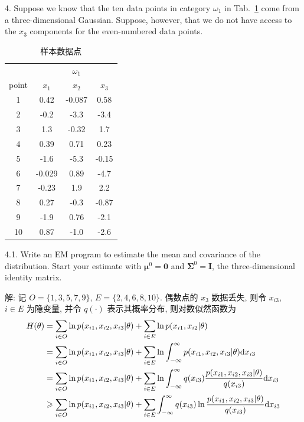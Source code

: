 \documentclass{article}
\begin{document}
4. Suppose we know that the ten data points in category $\omega_1$ in Tab.~\ref{tab:sampledata} come from a three-dimensional Gaussian. Suppose, however, that we do not have access to the $x_3$ components for the even-numbered data points.

\begin{table}[h]
  \centering
  \caption{样本数据点}
  \label{tab:sampledata}
  \begin{tabular}{c|ccc}
		\hline
		&  &  $\omega_1$ & \\
		point & $x_1$ & $x_2$ & $x_3$ \\
		\hline
		1 & 0.42 & -0.087 & 0.58\\
		2 & -0.2 & -3.3 & -3.4\\
		3 & 1.3 & -0.32 & 1.7\\
		4 & 0.39 & 0.71 & 0.23\\
		5 & -1.6 & -5.3 & -0.15\\
		6 & -0.029 & 0.89 & -4.7\\
		7 & -0.23 & 1.9 & 2.2\\
		8 & 0.27 & -0.3 & -0.87\\
		9 & -1.9 & 0.76 & -2.1\\
		10 & 0.87 & -1.0 & -2.6 \\
		\hline
	\end{tabular}
\end{table}

4.1. Write an EM program to estimate the mean and covariance of the distribution. Start your estimate with $\bm{\mu}^0=\bm{0}$ and $\bm{\Sigma}^0=\bm{I}$, the three-dimensional identity matrix.

解: 记 $O=\{1,3,5,7,9\}$, $E=\{2,4,6,8,10\}$. 偶数点的 $x_3$ 数据丢失, 则令 $x_{i3}$, $i\in E$ 为隐变量, 并令 $q(\cdot)$ 表示其概率分布, 则对数似然函数为
\begin{equation}
  \begin{aligned}
    H(\theta)
    &=\sum_{i\in O}\ln p(x_{i1},x_{i2},x_{i3}|\theta)+\sum_{i\in E}\ln p(x_{i1},x_{i2}|\theta)\\
    &=\sum_{i\in O}\ln p(x_{i1},x_{i2},x_{i3}|\theta)+\sum_{i\in E}\ln\int_{-\infty}^\infty p(x_{i1},x_{i2},x_{i3}|\theta)\mathrm{d}x_{i3}\\
    &=\sum_{i\in O}\ln p(x_{i1},x_{i2},x_{i3}|\theta)+\sum_{i\in E}\ln\int_{-\infty}^\infty q(x_{i3})\frac{p(x_{i1},x_{i2},x_{i3}|\theta)}{q(x_{i3})}\mathrm{d}x_{i3}\\
    &\geqslant\sum_{i\in O}\ln p(x_{i1},x_{i2},x_{i3}|\theta)+\sum_{i\in E}\int_{-\infty}^\infty q(x_{i3})\ln\frac{p(x_{i1},x_{i2},x_{i3}|\theta)}{q(x_{i3})}\mathrm{d}x_{i3}\\
  \end{aligned}
\end{equation}
\end{document}

